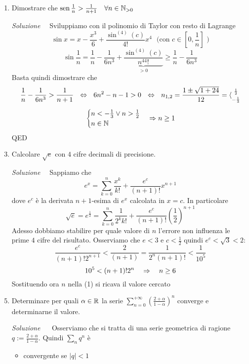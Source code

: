 \documentclass{article}
\begin{document}
\begin{enumerate}[label=\textbf{Esercizio 
    8.\arabic*.},itemindent=*]
\begin{enumerate}
    \end{enumerate}
\item Dimostrare che $\operatorname{sen}\frac{1}{n}>\frac{1}{n+1}~~~\forall n\in \mathbb{N}_{>0}$
\item[\textit{\large Soluzione~}]~Sviluppiamo con il polinomio di Taylor con resto di Lagrange
\[\sin x=x-\frac{x^3}{6}+\frac{\sin^{(4)}(c)}{4!}x^4~~~\text{(con $c\in\left[ 0,\frac{1}{n} \right]$ )}\]
\[\sin\frac{1}{n}=\frac{1}{n}-\frac{1}{6n^3}+\underbrace{\frac{\sin^{(4)}(c)}{n^44!}}_{>0}\geq\frac{1}{n}-\frac{1}{6n^3}\]
Basta quindi dimostrare che \[\frac{1}{n}-\frac{1}{6n^3}>\frac{1}{n+1}~~\Leftrightarrow~~6n^2-n-1>0~~\Leftrightarrow~~n_{1,2}=\frac{1\pm\sqrt{1+24}}{12}=\langle\begin{matrix}\scriptstyle\frac{1}{2}\\\scriptstyle-\frac{1}{3}\end{matrix}\]
\[\begin{cases}
    n<-\frac{1}{3}\lor n>\frac{1}{2}\\
    n\in\mathbb{N}
\end{cases}\Rightarrow n\geq1\]
QED
\item Calcolare $\sqrt{e}$ con $4$ cifre decimali di precisione.
\item[\textit{\large Soluzione~}]~Sappiamo che \[e^x=\sum_{k=0}^n\frac{x^k}{k!}+\frac{e^c}{(n+1)!}x^{n+1}\]
dove $e^c$ è la derivata $n+1$-esima di $e^x$ calcolata in $x=c$. In particolare
\begin{equation}\sqrt{e}=e^{\frac{1}{2}}=\sum_{k=0}^n\frac{1}{2^kk!}+\frac{e^c}{(n+1)!}\left( \frac{1}{2} \right)^{n+1}\end{equation}
Adesso dobbiamo stabilire per quale valore di $n$ l'errore non influenza le prime $4$ cifre del risultato. Osserviamo che $e<3$ e $c<\frac{1}{2}$ quindi $e^c<\sqrt{3}<2$:
\[\frac{e^c}{(n+1)!2^{n+1}}<\frac{2}{(n+1)}=\frac{1}{2^n(n+1)!}<\frac{1}{10^5}\]
\[10^5<(n+1)!2^n~~~\Rightarrow~~~n\geq6\]
Sostituendo ora $n$ nella (1) si ricava il valore cercato
\item Determinare per quali $\alpha\in \mathbb{R}$ la serie $\sum_{n= 0}^{+\infty}\left( \frac{2+\alpha}{1-\alpha} \right)^n$ converge e determinarne il valore.
\item[\textit{\large Soluzione~}]~ Osserviamo che si tratta di una serie geometrica di ragione $q:=\frac{2+\alpha}{1-\alpha}$. Quindi $\sum_nq^n$ è
\begin{itemize}
    \item convergente se $|q|<1$

\end{itemize}
\end{enumerate}
\end{document}
